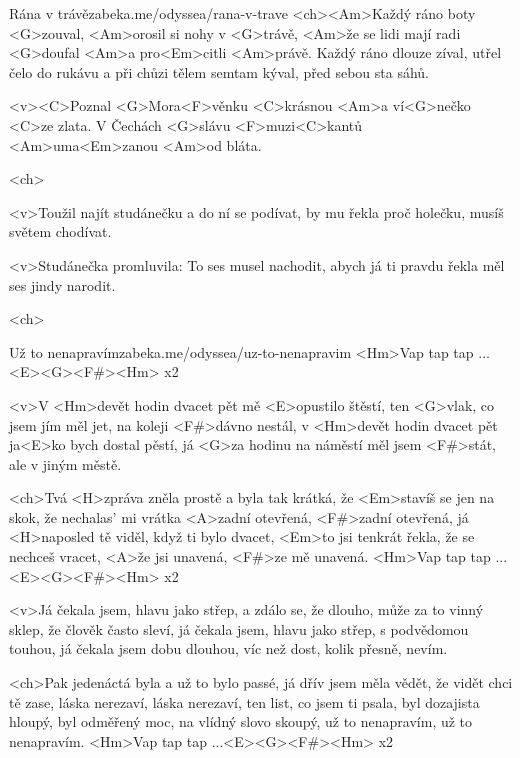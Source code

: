 \begin{song}{10}{Rána v trávě}{zabeka.me/odyssea/rana-v-trave}
	<ch><Am>Každý ráno boty <G>zouval,
	<Am>orosil si nohy v <G>trávě,
	<Am>že se lidi mají radi <G>doufal
	<Am>a pro<Em>citli <Am>právě.
	Každý ráno dlouze zíval,
	utřel čelo do rukávu
	a při chůzi tělem semtam kýval,
	před sebou sta sáhů.

	<v><C>Poznal <G>Mora<F>věnku <C>krásnou
	<Am>a ví<G>nečko <C>ze zlata.
	V Čechách <G>slávu <F>muzi<C>kantů
	<Am>uma<Em>zanou <Am>od bláta.

	<ch>

	<v>Toužil najít studánečku
	a do ní se podívat,
	by mu řekla proč holečku,
	musíš světem chodívat.

	<v>Studánečka promluvila:
	To ses musel nachodit,
	abych já ti pravdu řekla
	měl ses jindy narodit.

	<ch>
\end{song}
\begin{song}{11}{Už to nenapravím}{zabeka.me/odyssea/uz-to-nenapravim}
	<Hm>Vap tap tap ...<E><G><F#><Hm> x2

	<v>V <Hm>devět hodin dvacet pět mě <E>opustilo štěstí,
	ten <G>vlak, co jsem jím měl jet, na koleji <F#>dávno nestál,
	v <Hm>devět hodin dvacet pět ja<E>ko bych dostal pěstí,
	já <G>za hodinu na náměstí měl jsem <F#>stát,
	ale v jiným městě.

	<ch>Tvá <H>zpráva zněla prostě a byla tak krátká,
	že <Em>stavíš se jen na skok, že nechalas' mi vrátka
	<A>zadní otevřená, <F#>zadní otevřená,
	já <H>naposled tě viděl, když ti bylo dvacet,
	<Em>to jsi tenkrát řekla, že se nechceš vracet,
	<A>že jsi unavená, <F#>ze mě unavená.
	<Hm>Vap tap tap ...<E><G><F#><Hm> x2

	<v>Já čekala jsem, hlavu jako střep, a zdálo se, že dlouho,
	může za to vinný sklep, že člověk často sleví,
	já čekala jsem, hlavu jako střep, s podvědomou touhou,
	já čekala jsem dobu dlouhou, víc než dost, kolik přesně, nevím.

	<ch>Pak jedenáctá byla a už to bylo passé,
	já dřív jsem měla vědět, že vidět chci tě zase,
	láska nerezaví, láska nerezaví,
	ten list, co jsem ti psala, byl dozajista hloupý,
	byl odměřený moc, na vlídný slovo skoupý,
	už to nenapravím, už to nenapravím.
	<Hm>Vap tap tap ...<E><G><F#><Hm> x2
\end{song}
